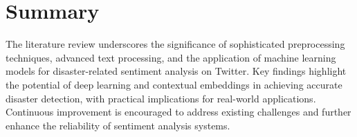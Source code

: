 \section{Summary} 
The literature review underscores the significance of sophisticated preprocessing techniques, 
advanced text processing, and the application of machine learning models for disaster-related 
sentiment analysis on Twitter. Key findings highlight the potential of deep learning and 
contextual embeddings in achieving accurate disaster detection, with practical implications for 
real-world applications. Continuous improvement is encouraged to address existing challenges 
and further enhance the reliability of sentiment analysis systems.
